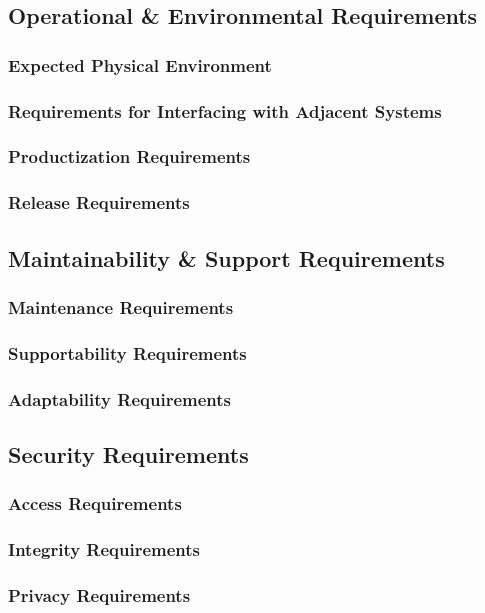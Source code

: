 \documentclass[titlepage]{article}
\begin{document}
\subsection{Operational \& Environmental Requirements}
\subsubsection{Expected Physical Environment}
\subsubsection{Requirements for Interfacing with Adjacent Systems}
\subsubsection{Productization Requirements}
\subsubsection{Release Requirements}

\subsection{Maintainability \& Support Requirements}
\subsubsection{Maintenance Requirements}
\subsubsection{Supportability Requirements}
\subsubsection{Adaptability Requirements}

\subsection{Security Requirements}
\subsubsection{Access Requirements}
\subsubsection{Integrity Requirements}
\subsubsection{Privacy Requirements}
\end{document}
